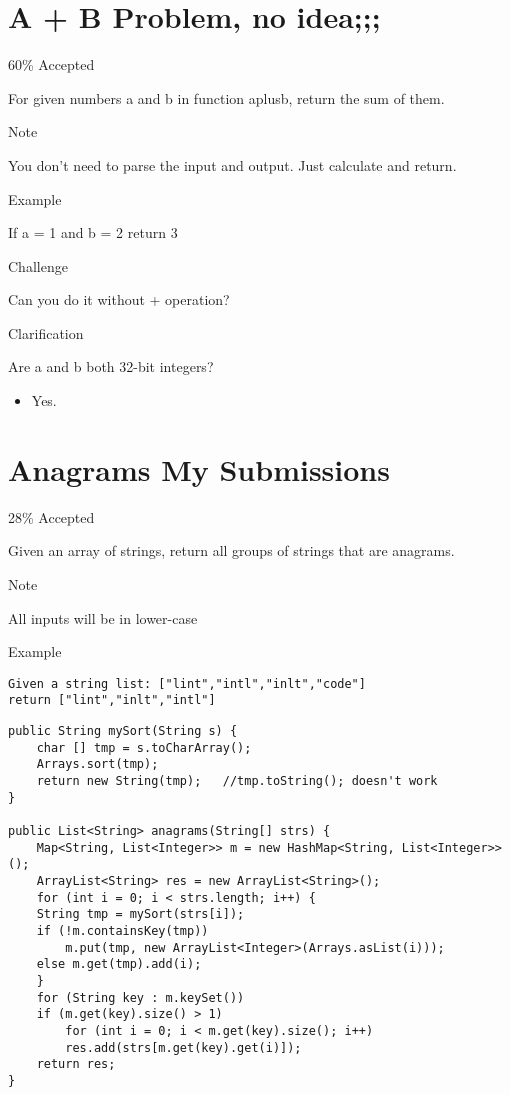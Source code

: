 \documentclass[12pt]{book}
\begin{document}
\chapter{A + B Problem, no idea;;;}
\label{sec-5}

60\% Accepted

For given numbers a and b in function aplusb, return the sum of them.

Note

You don't need to parse the input and output. Just calculate and return.

Example

If a = 1 and b = 2 return 3

Challenge

Can you do it without + operation?

Clarification

Are a and b both 32-bit integers?

\begin{itemize}
\item Yes.
\end{itemize}
\chapter{Anagrams My Submissions}
\label{sec-6}

28\% Accepted

Given an array of strings, return all groups of strings that are anagrams.

Note

All inputs will be in lower-case

Example
\lstset{language=java,label= ,caption= ,numbers=none}
\begin{lstlisting}
Given a string list: ["lint","intl","inlt","code"]
return ["lint","inlt","intl"]
\end{lstlisting}
\lstset{language=java,label= ,caption= ,numbers=none}
\begin{lstlisting}
public String mySort(String s) {
    char [] tmp = s.toCharArray();
    Arrays.sort(tmp);
    return new String(tmp);   //tmp.toString(); doesn't work
}

public List<String> anagrams(String[] strs) {
    Map<String, List<Integer>> m = new HashMap<String, List<Integer>>();
    ArrayList<String> res = new ArrayList<String>();
    for (int i = 0; i < strs.length; i++) {
	String tmp = mySort(strs[i]);
	if (!m.containsKey(tmp))
	    m.put(tmp, new ArrayList<Integer>(Arrays.asList(i)));
	else m.get(tmp).add(i);
    }
    for (String key : m.keySet()) 
	if (m.get(key).size() > 1)
	    for (int i = 0; i < m.get(key).size(); i++) 
		res.add(strs[m.get(key).get(i)]);
    return res;
}
\end{lstlisting}
\end{document}
